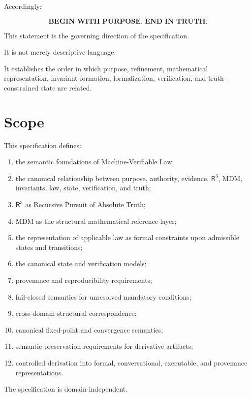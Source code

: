 \documentclass[11pt]{article}
\newcommand{\Rthree}{\ensuremath{\mathsf{R}^{3}}}
\newcommand{\MDM}{\ensuremath{\mathrm{MDM}}}
\begin{document}
Accordingly:

\[
\boxed{
\textbf{BEGIN WITH PURPOSE. END IN TRUTH.}
}
\]

This statement is the governing direction of the specification.

It is not merely descriptive language.

It establishes the order in which purpose, refinement,
mathematical representation, invariant formation, formalization,
verification, and truth-constrained state are related.

\section{Scope}

This specification defines:

\begin{enumerate}[label=\arabic*.]
    \item the semantic foundations of Machine-Verifiable Law;
    \item the canonical relationship between purpose, authority,
          evidence, \Rthree{}, \MDM{}, invariants, law, state,
          verification, and truth;
    \item \Rthree{} as Recursive Pursuit of Absolute Truth;
    \item \MDM{} as the structural mathematical reference layer;
    \item the representation of applicable law as formal constraints
          upon admissible states and transitions;
    \item the canonical state and verification models;
    \item provenance and reproducibility requirements;
    \item fail-closed semantics for unresolved mandatory conditions;
    \item cross-domain structural correspondence;
    \item canonical fixed-point and convergence semantics;
    \item semantic-preservation requirements for derivative artifacts;
    \item controlled derivation into formal, conversational,
          executable, and provenance representations.
\end{enumerate}

The specification is domain-independent.
\end{document}
